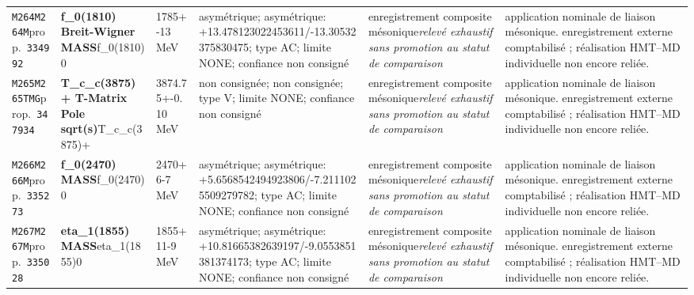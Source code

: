 \begin{landscape}
\begin{longtable}{L{1.85cm}L{4.45cm}L{2.35cm}L{4.05cm}L{3.35cm}L{7.15cm}}
\texttt{M264}\newline \texttt{M264M}\newline prop.\ \texttt{334992} & \textbf{f\_\allowbreak{}0(1810) Breit-Wigner MASS}\newline f\_\allowbreak{}0(1810)0 & 1785+-13\,MeV & asymétrique; asymétrique: +13.478123022453611/-13.30532375830475; type AC; limite NONE; confiance non consigné & enregistrement composite mésonique\newline \emph{relevé exhaustif sans promotion au statut de comparaison} & application nominale de liaison mésonique. enregistrement externe comptabilisé ; réalisation HMT--MD individuelle non encore reliée. \\
\texttt{M265}\newline \texttt{M265TMG}\newline prop.\ \texttt{347934} & \textbf{T\_\allowbreak{}c\_\allowbreak{}c(3875)+ T-Matrix Pole sqrt(s)}\newline T\_\allowbreak{}c\_\allowbreak{}c(3875)+ & 3874.75+-0.10\,MeV & non consignée; non consignée; type V; limite NONE; confiance non consigné & enregistrement composite mésonique\newline \emph{relevé exhaustif sans promotion au statut de comparaison} & application nominale de liaison mésonique. enregistrement externe comptabilisé ; réalisation HMT--MD individuelle non encore reliée. \\
\texttt{M266}\newline \texttt{M266M}\newline prop.\ \texttt{335273} & \textbf{f\_\allowbreak{}0(2470) MASS}\newline f\_\allowbreak{}0(2470)0 & 2470+6-7\,MeV & asymétrique; asymétrique: +5.6568542494923806/-7.2111025509279782; type AC; limite NONE; confiance non consigné & enregistrement composite mésonique\newline \emph{relevé exhaustif sans promotion au statut de comparaison} & application nominale de liaison mésonique. enregistrement externe comptabilisé ; réalisation HMT--MD individuelle non encore reliée. \\
\texttt{M267}\newline \texttt{M267M}\newline prop.\ \texttt{335028} & \textbf{eta\_\allowbreak{}1(1855) MASS}\newline eta\_\allowbreak{}1(1855)0 & 1855+11-9\,MeV & asymétrique; asymétrique: +10.81665382639197/-9.0553851381374173; type AC; limite NONE; confiance non consigné & enregistrement composite mésonique\newline \emph{relevé exhaustif sans promotion au statut de comparaison} & application nominale de liaison mésonique. enregistrement externe comptabilisé ; réalisation HMT--MD individuelle non encore reliée. \\

\end{longtable}
\end{landscape}
